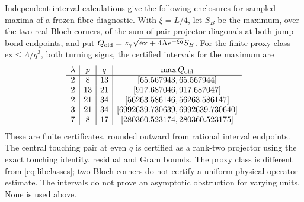 \begin{remark}
\label{rem:libcertificates}
Independent interval calculations give the following enclosures
for sampled maxima of a frozen-fibre diagnostic. With
$\xi=L/4$, let $S_B$ be the maximum, over the two real Bloch corners,
of the sum of pair-projector diagonals at both jump-bond endpoints,
and put $Q_{\rm old}=z_\gamma\sqrt{\mathrm{ex}+4\Lambda e^{-\xi q}}S_B$.
For the finite proxy class $\mathrm{ex}\le\Lambda/q^3$, both turning
signs, the certified intervals for the maximum are
\[
\begin{array}{c|c|c|c}
 \lambda&p&q&\max Q_{\rm old}\\ \hline
 2&8&13&[65.567943,65.567944]\\
 2&13&21&[917.687046,917.687047]\\
 2&21&34&[56263.586146,56263.586147]\\
 3&21&34&[6992639.730639,6992639.730640]\\
 7&8&17&[280360.523174,280360.523175]
\end{array}
\]
These are finite certificates, rounded outward from rational
interval endpoints. The central touching pair at even $q$ is
certified as a rank-two projector using the exact touching identity,
residual and Gram bounds. The proxy class is different from
\eqref{eq:libclasses}; two Bloch corners do not certify a uniform
physical operator estimate. The intervals do not prove an
asymptotic obstruction for varying units. None is used above.
\end{remark}
